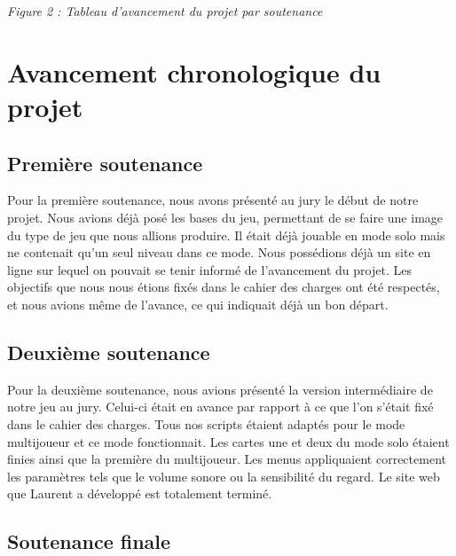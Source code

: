 \documentclass[a4paper , 12pt]{article}
\begin{document}
\quad

\begin{centering}

\textit{Figure 2 : Tableau d'avancement du projet par soutenance}

\end{centering}

\newpage

\section{Avancement chronologique du projet}

	\subsection{Première soutenance}

	\quad

Pour la première soutenance, nous avons présenté au jury le début de notre projet. Nous avions déjà posé les bases du jeu, permettant de se faire une image du type de jeu que nous allions produire. Il était déjà jouable en mode solo mais ne contenait qu’un seul niveau dans ce mode. Nous possédions déjà un site en ligne sur lequel on pouvait se tenir informé de l’avancement du projet. Les objectifs que nous nous étions fixés dans le cahier des charges ont été respectés, et nous avions même de l’avance, ce qui indiquait déjà un bon départ.
	\quad

	\subsection{Deuxième soutenance}

	\quad

Pour la deuxième soutenance, nous avions présenté la version intermédiaire de notre jeu au jury. Celui-ci était en avance par rapport à ce que l’on s’était fixé dans le cahier des charges. Tous nos scripts étaient adaptés pour le mode multijoueur et ce mode fonctionnait. Les cartes une et deux du mode solo étaient finies ainsi que la première du multijoueur. Les menus appliquaient correctement les paramètres tels que le volume sonore ou la sensibilité du regard. Le site web que Laurent a développé est totalement terminé.

	\quad

	\subsection{Soutenance finale}
\end{document}
